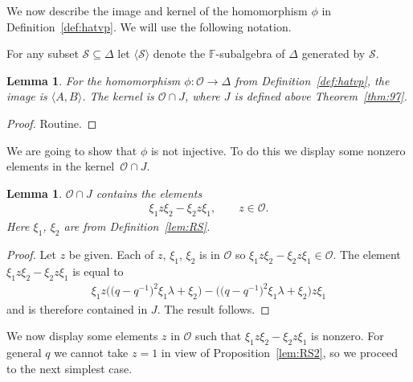 \documentclass[pdftex]{sigma}
\numberwithin{equation}{section}
\newtheorem{Lemma}[Theorem]{Lemma}
\begin{document}
 We now describe the image and kernel of the
 homomorphism $\phi$ in Def\/inition~\ref{def:hatvp}.
We will use the following notation.


\begin{Definition}
\label{def:mathcalS}
For any subset $\mathcal S \subseteq \Delta$
let $\langle \mathcal S\rangle$ denote the
$\mathbb F$-subalgebra of $\Delta$ generated by
$\mathcal S$.
\end{Definition}

\begin{Lemma}
\label{def:hatvpbasic}
For the homomorphism
$\phi :\mathcal O \to \Delta $ from
Definition~{\rm \ref{def:hatvp}},
the image is
$\langle A,B\rangle$. The kernel is
${\mathcal O} \cap J$,
where $J$ is defined above
Theorem~{\rm \ref{thm:97}}.
\end{Lemma}

\begin{proof}
Routine.
\end{proof}

We are going to show
that
$\phi$ is not injective. To do this
we display some nonzero elements in the
kernel~${\mathcal O} \cap J$.


\begin{Lemma}
\label{lem:RS3}
${\mathcal O} \cap J$
contains
the elements
\begin{gather*}
\xi_1 z  \xi_2-\xi_2 z \xi_1,
\qquad
z \in {\mathcal O}.
\end{gather*}
Here $\xi_1$, $\xi_2$ are
from Definition~{\rm \ref{lem:RS}}.
\end{Lemma}

\begin{proof}
Let $z $ be given.
Each of
$z$, $\xi_1$, $\xi_2$ is in
$\mathcal O$ so
$\xi_1 z  \xi_2-\xi_2 z \xi_1 \in \mathcal O$.
The element
$\xi_1 z  \xi_2-\xi_2 z \xi_1$ is equal to
\begin{gather*}
\xi_1 z\big( \big(q-q^{-1}\big)^2 \xi_1 \lambda +  \xi_2\big)
-
\big(\big(q-q^{-1}\big)^2 \xi_1 \lambda +  \xi_2\big)
z \xi_1
\end{gather*}
and is therefore contained in $J$. The result follows.
\end{proof}

We now display
some elements $z$ in $\mathcal O$ such that
$\xi_1 z \xi_2-\xi_2 z \xi_1$ is nonzero.
For general $q$ we cannot take $z=1$ in view of
Proposition~\ref{lem:RS2}, so we proceed to the next simplest
case.
\end{document}
